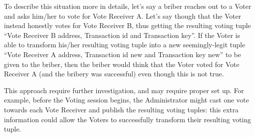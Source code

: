 \documentclass[10pt, letterpaper]{article}
\begin{document}
To describe this situation more in details, let’s say a briber reaches out to a Voter and asks him/her to vote for Vote Receiver A. Let’s say though that the Voter instead honestly votes for Vote Receiver B, thus getting the resulting voting tuple “Vote Receiver B address, Transaction id and Transaction key”. If the Voter is able to transform his/her resulting voting tuple into a new seemingly-legit tuple “Vote Receiver A address, Transaction id new and Transaction key new” to be given to the briber, then the briber would think that the Voter voted for Vote Receiver A (and the bribery was successful) even though this is not true.
\bigskip

This approach require further investigation, and may require proper set up. For example, before the Voting session begins, the Administrator might cast one vote towards each Vote Receiver and publish the resulting voting tuples: this extra information could allow the Voters to successfully transform their resulting voting tuple.
\end{document}
